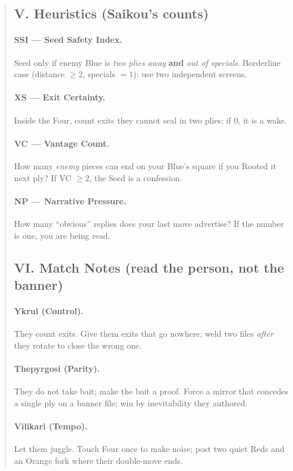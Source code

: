 \documentclass[11pt]{article}
\begin{document}
\begin{quote}
\subsection{V. Heuristics (Saikou’s counts)}
\paragraph{SSI — Seed Safety Index.} Seed only if enemy Blue is \emph{two plies away} \textbf{and} \emph{out of specials}. Borderline case (distance $\ge 2$, specials $=1$): use two independent screens.
\paragraph{XS — Exit Certainty.} Inside the Four, count exits they cannot seal in two plies; if $0$, it is a wake.
\paragraph{VC — Vantage Count.} How many \emph{enemy} pieces can end on your Blue’s square if you Rooted it next ply? If VC $\ge 2$, the Seed is a confession.
\paragraph{NP — Narrative Pressure.} How many “obvious” replies does your last move advertise? If the number is one, you are being read.

\subsection{VI. Match Notes (read the person, not the banner)}
\paragraph{Ykrul (Control).} They count exits. Give them exits that go nowhere; weld two files \emph{after} they rotate to close the wrong one.
\paragraph{Thepyrgosi (Parity).} They do not take bait; make the bait a proof. Force a mirror that concedes a single ply on a banner file; win by inevitability they authored.
\paragraph{Vilikari (Tempo).} Let them juggle. Touch Four once to make noise; post two quiet Reds and an Orange fork where their double-move ends.

\end{quote}
\end{document}
